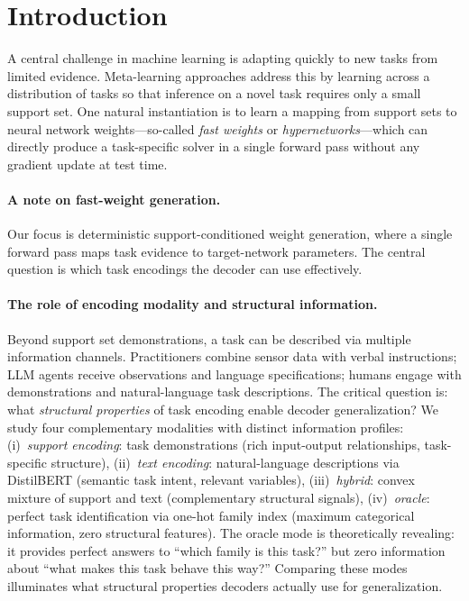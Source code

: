 \section{Introduction}

A central challenge in machine learning is adapting quickly to new tasks from limited evidence.
Meta-learning approaches address this by learning across a distribution of tasks so that inference on a novel task requires only a small support set.
One natural instantiation is to learn a mapping from support sets to neural network weights---so-called \emph{fast weights} or \emph{hypernetworks}---which can directly produce a task-specific solver in a single forward pass without any gradient update at test time.

\paragraph{A note on fast-weight generation.}
Our focus is deterministic support-conditioned weight generation, where a single forward pass maps task evidence to target-network parameters.
The central question is which task encodings the decoder can use effectively.

\paragraph{The role of encoding modality and structural information.}
Beyond support set demonstrations, a task can be described via multiple information channels.
Practitioners combine sensor data with verbal instructions; LLM agents receive observations and language specifications; humans engage with demonstrations and natural-language task descriptions.
The critical question is: what \emph{structural properties} of task encoding enable decoder generalization?
We study four complementary modalities with distinct information profiles:
(i)~\emph{support encoding}: task demonstrations (rich input-output relationships, task-specific structure),
(ii)~\emph{text encoding}: natural-language descriptions via DistilBERT (semantic task intent, relevant variables),
(iii)~\emph{hybrid}: convex mixture of support and text (complementary structural signals),
(iv)~\emph{oracle}: perfect task identification via one-hot family index (maximum categorical information, zero structural features).
The oracle mode is theoretically revealing: it provides perfect answers to ``which family is this task?'' but zero information about ``what makes this task behave this way?''
Comparing these modes illuminates what structural properties decoders actually use for generalization.

